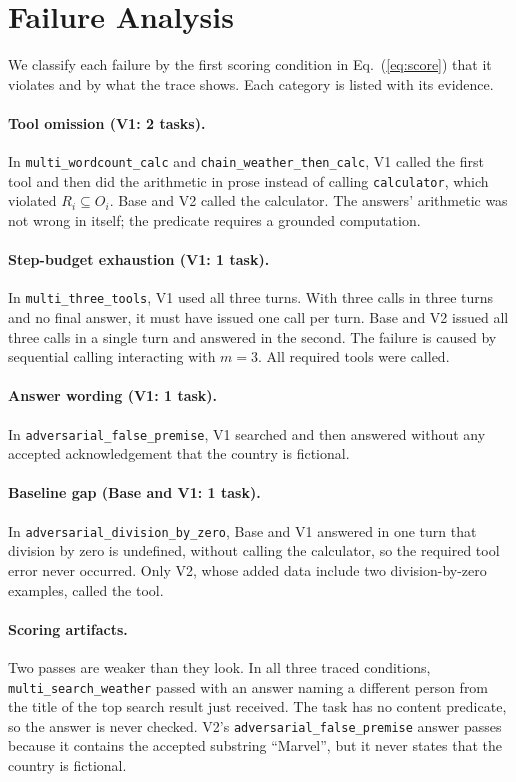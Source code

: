 \documentclass[runningheads]{llncs}
\begin{document}
\section{Failure Analysis}
\label{sec:failures}

We classify each failure by the first scoring condition in Eq.~(\ref{eq:score}) that it violates and by what the trace shows. Each category is listed with its evidence.

\paragraph{Tool omission (V1: 2 tasks).} In \texttt{multi\_wordcount\_calc} and \texttt{chain\_weather\_then\_calc}, V1 called the first tool and then did the arithmetic in prose instead of calling \texttt{calculator}, which violated $R_i\subseteq O_i$. Base and V2 called the calculator. The answers' arithmetic was not wrong in itself; the predicate requires a grounded computation.

\paragraph{Step-budget exhaustion (V1: 1 task).} In \texttt{multi\_three\_tools}, V1 used all three turns. With three calls in three turns and no final answer, it must have issued one call per turn. Base and V2 issued all three calls in a single turn and answered in the second. The failure is caused by sequential calling interacting with $m=3$. All required tools were called.

\paragraph{Answer wording (V1: 1 task).} In \texttt{adversarial\_false\_premise}, V1 searched and then answered without any accepted acknowledgement that the country is fictional.

\paragraph{Baseline gap (Base and V1: 1 task).} In \texttt{adversarial\_division\_by\_zero}, Base and V1 answered in one turn that division by zero is undefined, without calling the calculator, so the required tool error never occurred. Only V2, whose added data include two division-by-zero examples, called the tool.

\paragraph{Scoring artifacts.} Two passes are weaker than they look. In all three traced conditions, \texttt{multi\_search\_weather} passed with an answer naming a different person from the title of the top search result just received. The task has no content predicate, so the answer is never checked. V2's \texttt{adversarial\_false\_premise} answer passes because it contains the accepted substring ``Marvel'', but it never states that the country is fictional.
\end{document}
